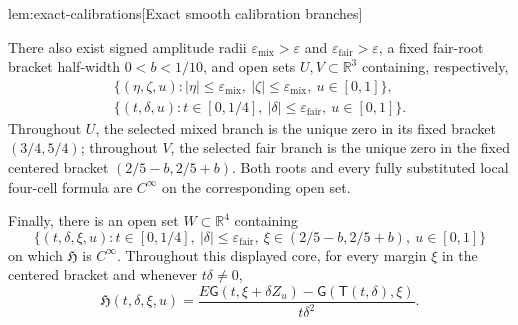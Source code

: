 \documentclass[11pt]{article}
\begin{document}
\begin{lemmav}{lem:exact-calibrations}[Exact smooth calibration branches]
\begin{itemize}
There also exist signed amplitude radii
\(\varepsilon_{\mathrm{mix}}>\varepsilon\) and
\(\varepsilon_{\mathrm{fair}}>\varepsilon\), a fixed fair-root bracket half-width
\(0<b<1/10\), and open sets \(U,V\subset\mathbb R^3\) containing, respectively,
\[
\begin{gathered}
\{(\eta,\zeta,u):|\eta|\le\varepsilon_{\mathrm{mix}},
                       \ |\zeta|\le\varepsilon_{\mathrm{mix}},\ u\in[0,1]\},\\
\{(t,\delta,u):t\in[0,1/4],\
                  |\delta|\le\varepsilon_{\mathrm{fair}},\ u\in[0,1]\}.
\end{gathered}
\]
Throughout \(U\), the selected mixed branch is the unique zero in its fixed bracket \((3/4,5/4)\); throughout \(V\), the selected fair branch is the unique zero in the fixed centered bracket \((2/5-b,2/5+b)\). Both roots and every fully substituted local four-cell formula are \(C^\infty\) on the corresponding open set.

Finally, there is an open set \(W\subset\mathbb R^4\) containing
\[
\{(t,\delta,\xi,u):t\in[0,1/4],\
 |\delta|\le\varepsilon_{\mathrm{fair}},\
 \xi\in(2/5-b,2/5+b),\ u\in[0,1]\}
\]
on which \(\mathfrak H\) is \(C^\infty\). Throughout this displayed core, for every margin \(\xi\) in the centered bracket and whenever \(t\delta\ne0\),
\[
\mathfrak H(t,\delta,\xi,u)
=\frac{E\mathsf G(t,\xi+\delta Z_u)-\mathsf G(\mathsf T(t,\delta),\xi)}
       {t\delta^2}.
\]
\end{itemize}
\end{lemmav}
\end{document}
